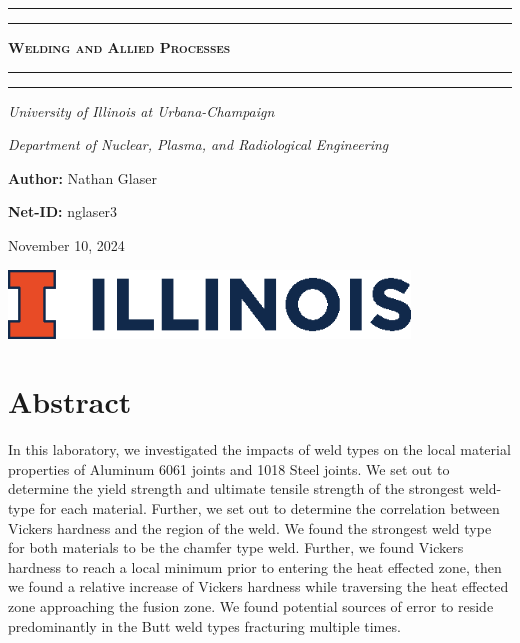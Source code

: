 \documentclass{article}
\begin{document}
\newcommand{\Fig}[3]{\begin{figure}[!h!]\centering\texttt{[image: \#1]}\caption{#2}\label{#3}\end{figure}}
\begin{titlepage}

\centering
\scshape


%
\rule{\textwidth}{1.6pt}\vspace*{-\baselineskip}\vspace*{2pt}
\rule{\textwidth}{0.4pt}

{\Huge \textbf{\textsc{ Welding and Allied Processes \\
\vspace{15pt}}}}

\rule{\textwidth}{0.4pt}\vspace*{-\baselineskip}\vspace{3pt}
\rule{\textwidth}{1.6pt}\vspace{6pt}
\centerline{\textit{University of Illinois at Urbana-Champaign}} 
\centerline{\textit{Department of Nuclear, Plasma, and Radiological Engineering}}
\vspace{1.5\baselineskip}


\large \centerline{\textbf{Author:} Nathan Glaser}
\large \centerline{\textbf{Net-ID:} nglaser3}
\quad
\large \centerline{November 10, 2024}

\vfill{}
\includegraphics[width=0.8\textwidth]{./illinois.eps}\\[1cm]
%
\end{titlepage}

\tableofcontents
\newpage
{}

\section{Abstract}
In this laboratory, we investigated the impacts of weld types on the local material properties of Aluminum 6061 joints and 1018 Steel joints. We set out to determine the yield strength and ultimate tensile strength of the strongest weld-type for each material. Further, we set out to determine the correlation between Vickers hardness and the region of the weld. We found the strongest weld type for both materials to be the chamfer type weld. Further, we found Vickers hardness to reach a local minimum prior to entering the heat effected zone, then we found a relative increase of Vickers hardness while traversing the heat effected zone approaching the fusion zone. We found potential sources of error to reside predominantly in the Butt weld types fracturing multiple times. 
\end{document}
